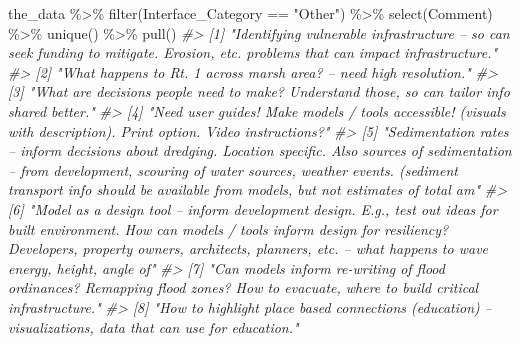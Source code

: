 \documentclass[
]{article}
\newenvironment{Shaded}{\begin{snugshade}}{\end{snugshade}}
\newcommand{\CommentTok}[1]{\textcolor[rgb]{0.56,0.35,0.01}{\textit{#1}}}
\newcommand{\FunctionTok}[1]{\textcolor[rgb]{0.00,0.00,0.00}{#1}}
\newcommand{\NormalTok}[1]{#1}
\newcommand{\SpecialCharTok}[1]{\textcolor[rgb]{0.00,0.00,0.00}{#1}}
\newcommand{\StringTok}[1]{\textcolor[rgb]{0.31,0.60,0.02}{#1}}
\begin{document}
\begin{Shaded}
\begin{Highlighting}[]
\NormalTok{the\_data }\SpecialCharTok{\%\textgreater{}\%}
  \FunctionTok{filter}\NormalTok{(Interface\_Category }\SpecialCharTok{==} \StringTok{"Other"}\NormalTok{) }\SpecialCharTok{\%\textgreater{}\%}
  \FunctionTok{select}\NormalTok{(Comment) }\SpecialCharTok{\%\textgreater{}\%}
  \FunctionTok{unique}\NormalTok{() }\SpecialCharTok{\%\textgreater{}\%}
  \FunctionTok{pull}\NormalTok{()}
\CommentTok{\#\textgreater{}  [1] "Identifying vulnerable infrastructure – so can seek funding to mitigate. Erosion, etc. problems that can impact infrastructure."                                                                                                                                }
\CommentTok{\#\textgreater{}  [2] "What happens to Rt. 1 across marsh area? – need high resolution."                                                                                                                                                                                               }
\CommentTok{\#\textgreater{}  [3] "What are decisions people need to make?  Understand those, so can tailor info shared better."                                                                                                                                                                   }
\CommentTok{\#\textgreater{}  [4] "Need user guides! Make models / tools accessible! (visuals with description). Print option.  Video instructions?"                                                                                                                                               }
\CommentTok{\#\textgreater{}  [5] "Sedimentation rates – inform decisions about dredging.  Location specific. Also sources of sedimentation – from development, scouring of water sources, weather events. (sediment transport info should be available from models, but not estimates of total am"}
\CommentTok{\#\textgreater{}  [6] "Model as a design tool – inform development design.   E.g., test out ideas for built environment. How can models / tools inform design for resiliency?  Developers, property owners, architects, planners, etc. – what happens to wave energy, height, angle of"}
\CommentTok{\#\textgreater{}  [7] "Can models inform re{-}writing of flood ordinances?  Remapping flood zones? How to evacuate, where to build critical infrastructure."                                                                                                                             }
\CommentTok{\#\textgreater{}  [8] "How to highlight place based connections (education) – visualizations, data that can use for education."                                                                                                                                                        }

\end{Highlighting}
\end{Shaded}
\end{document}
